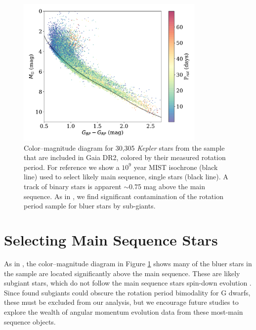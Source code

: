 \documentclass[preprint2]{aastex62}
\newcommand{\Kepler}{\textsl{Kepler}\xspace}
\begin{document}
\begin{figure}[]
\centering
\includegraphics[width=3.6in]{../figures/cmd}
\caption{
Color--magnitude diagram for 30,305 \Kepler stars from the \citet{mcquillan2014} sample that are included in Gaia DR2, colored by their measured rotation period. For reference we show a $10^9$ year MIST isochrone (black line) used to select likely main sequence, single stars (black line). A track of binary  stars is apparent $\sim$0.75 mag above the main sequence. As in \citet{davenport2017}, we find significant contamination of the rotation period sample for bluer stars by sub-giants.}
\label{fig:cmd}
\end{figure}




\section{Selecting Main Sequence Stars}

As in \citet{davenport2017}, the color--magnitude diagram in Figure \ref{fig:cmd} shows many of the bluer stars in the \citet{mcquillan2014} sample are located significantly above the main sequence. These are likely subgiant stars, which do not follow the main sequence stars spin-down evolution \citep[e.g.][]{donascimento2012, van-saders2013}. Since \citet{davenport2017} found subgiants could obscure the rotation period bimodality for G dwarfs, these must be excluded from our analysis, but we encourage future studies to explore the wealth of angular momentum evolution data from these most-main sequence objects.
\end{document}
